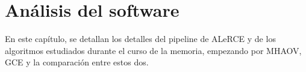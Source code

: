 
\chapter{Análisis del software}\label{chap:analisis}

En este capítulo, se detallan los detalles del pipeline de ALeRCE y de los algoritmos estudiados durante el curso de la memoria, empezando por MHAOV, GCE y la comparación entre estos dos.

